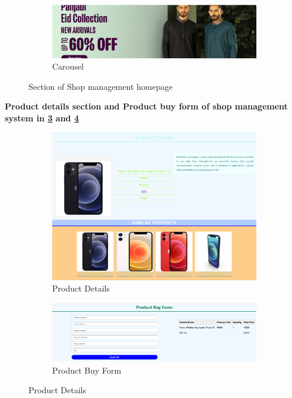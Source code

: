 \begin{figure}[ht]
    \begin{subfigure}[b]{\textwidth}
        \centering
        \includegraphics[width=\textwidth]{designs/carousel.png}
        \caption{Carousel}
        \label{fig:6.2.5}
    \end{subfigure}
    
    
    \caption{Section of Shop management homepage}
    \label{fig:fig6.2.2}
\end{figure}


\newpage
\textbf{Product details section and Product buy form of shop management system in \ref{fig:fig 6.2.6} and \ref{fig:fig 6.2.7}}\\[1cm]
\begin{figure}[ht]
    \centering
    \begin{subfigure}{\textwidth}
          \centering  
           \includegraphics[width=\textwidth]{designs/product details sections.png}   
        \caption{Product Details}
        \label{fig:fig 6.2.6}
    \end{subfigure}

    \begin{subfigure}{\textwidth}
        \centering  
        \includegraphics[width=\textwidth ]{designs/product buy form.png}    
        \caption{Product Buy Form}
        \label{fig:fig 6.2.7}
    \end{subfigure}
    
    \caption{Product Details}
    \label{fig:product_details}
\end{figure}

